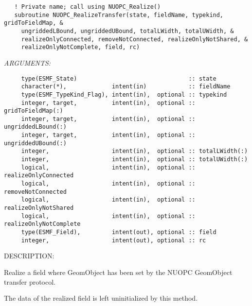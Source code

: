 \begin{verbatim}   ! Private name; call using NUOPC_Realize()
   subroutine NUOPC_RealizeTransfer(state, fieldName, typekind, gridToFieldMap, &
     ungriddedLBound, ungriddedUBound, totalLWidth, totalUWidth, &
     realizeOnlyConnected, removeNotConnected, realizeOnlyNotShared, &
     realizeOnlyNotComplete, field, rc)\end{verbatim}{\em ARGUMENTS:}
\begin{verbatim}     type(ESMF_State)                                :: state
     character(*),             intent(in)            :: fieldName
     type(ESMF_TypeKind_Flag), intent(in),  optional :: typekind
     integer, target,          intent(in),  optional :: gridToFieldMap(:)
     integer, target,          intent(in),  optional :: ungriddedLBound(:)
     integer, target,          intent(in),  optional :: ungriddedUBound(:)
     integer,                  intent(in),  optional :: totalLWidth(:)
     integer,                  intent(in),  optional :: totalUWidth(:)
     logical,                  intent(in),  optional :: realizeOnlyConnected
     logical,                  intent(in),  optional :: removeNotConnected
     logical,                  intent(in),  optional :: realizeOnlyNotShared
     logical,                  intent(in),  optional :: realizeOnlyNotComplete
     type(ESMF_Field),         intent(out), optional :: field
     integer,                  intent(out), optional :: rc\end{verbatim}
{\sf DESCRIPTION:\\ }


     \label{NUOPC_RealizeTransfer}
  
     Realize a field where GeomObject has been set by the NUOPC GeomObject
     transfer protocol.
  
     The data of the realized field is left uninitialized by this method.
  
